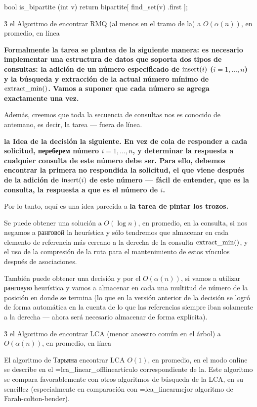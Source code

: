 bool is_bipartite (int v) {
return bipartite[ find_set(v) .first ];
}
\endcode



\h3{ el Algoritmo de encontrar RMQ (al menos en el tramo de la) a $O(\alpha(n))$, en promedio, en línea }

\bf{Formalmente} la tarea se plantea de la siguiente manera: es necesario implementar una estructura de datos que soporta dos tipos de consultas: la adición de un número especificado de ${\rm insert}(i)$ ($i = 1, \ldots, n$) y la búsqueda y extracción de la actual número mínimo de ${\rm extract\_min}()$. Vamos a suponer que cada número se agrega exactamente una vez.

Además, creemos que toda la secuencia de consultas nos es conocido de antemano, es decir, la tarea --- fuera de línea.

\bf{la Idea de la decisión} la siguiente. En vez de cola de responder a cada solicitud, переберем número $i = 1, \ldots, n$, y determinar la respuesta a cualquier consulta de este número debe ser. Para ello, debemos encontrar la primera no respondida la solicitud, el que viene después de la adición de ${\rm insert}(i)$ de este número --- fácil de entender, que es la consulta, la respuesta a que es el número de $i$.

Por lo tanto, aquí es una idea parecida a \bf{la tarea de pintar los trozos}.

Se puede obtener una solución a $O(\log n)$, en promedio, en la consulta, si nos negamos a ранговой la heurística y sólo tendremos que almacenar en cada elemento de referencia más cercano a la derecha de la consulta ${\rm extract\_min}()$, y el uso de la compresión de la ruta para el mantenimiento de estos vínculos después de asociaciones.

También puede obtener una decisión y por el $O(\alpha(n))$, si vamos a utilizar ранговую heurística y vamos a almacenar en cada una multitud de número de la posición en donde se termina (lo que en la versión anterior de la decisión se logró de forma automática en la cuenta de lo que las referencias siempre iban solamente a la derecha --- ahora será necesario almacenar de forma explícita).



\h3{ el Algoritmo de encontrar LCA (menor ancestro común en el árbol) a $O(\alpha(n))$, en promedio, en línea }

El algoritmo de Тарьяна encontrar LCA $O(1)$, en promedio, en el modo online se describe en el \algohref=lca_linear_offline{artículo correspondiente de la}. Este algoritmo se compara favorablemente con otros algoritmos de búsqueda de la LCA, en su sencillez (especialmente en comparación con \algohref=lca_linear{mejor algoritmo de Farah-colton-bender}).



